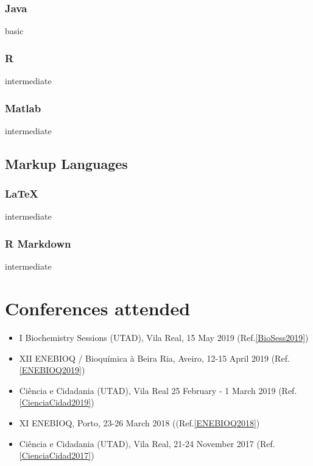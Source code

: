\documentclass{article}
\begin{document}
\subsubsection{Java}
basic
\subsubsection{R}
intermediate
\subsubsection{Matlab}
intermediate

\subsection{Markup Languages}
\subsubsection{\LaTeX}
intermediate
\subsubsection{R Markdown}
intermediate

\section{Conferences attended}
\begin{itemize}
\item I Biochemistry Sessions (UTAD), Vila Real, 15 May 2019 (Ref.\ref{BioSess2019})
\item XII ENEBIOQ / Bioquímica à Beira Ria, Aveiro, 12-15 April 2019 (Ref.\ref{ENEBIOQ2019})
\item Ciência e Cidadania (UTAD), Vila Real 25 February - 1 March 2019 (Ref.\ref{CienciaCidad2019})
\item XI ENEBIOQ, Porto, 23-26 March 2018 ((Ref.\ref{ENEBIOQ2018})
\item Ciência e Cidadania (UTAD), Vila Real, 21-24 November 2017 (Ref.\ref{CienciaCidad2017})
\end{itemize}
\end{document}
